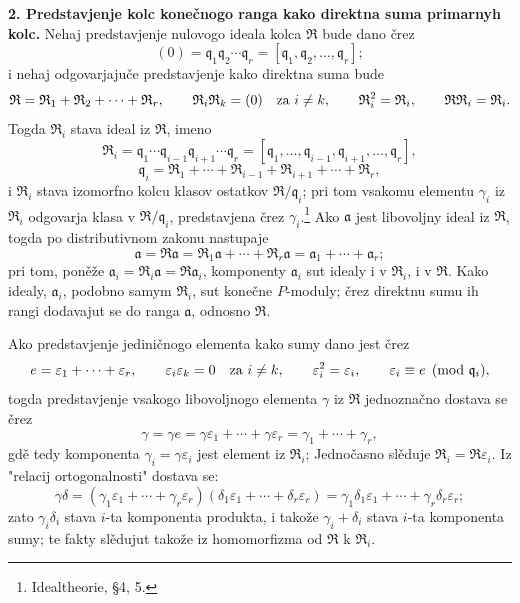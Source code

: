 \documentclass[11pt]{article}
\begin{document}
\setcounter{footnote}{19}

\textbf{2. Predstavjenje kolc konečnogo ranga kako direktna suma primarnyh kolc.} Nehaj predstavjenje nulovogo ideala kolca $\mathfrak R$ bude dano črez
\[
   (0)=\mathfrak q_1\mathfrak q_2\cdots\mathfrak q_r
      =[\mathfrak q_1,\mathfrak q_2,\ldots,\mathfrak q_r];
\]
i nehaj odgovarjajuče predstavjenje kako direktna suma bude
\[
   \mathfrak R=\mathfrak R_1+\mathfrak R_2+\cdots+\mathfrak R_r,
   \qquad
   \mathfrak R_i\mathfrak R_k=(0)\quad\hbox{za } i\ne k,
   \qquad
   \mathfrak R_i^2=\mathfrak R_i,
   \qquad
   \mathfrak R\mathfrak R_i=\mathfrak R_i.
\]
Togda $\mathfrak R_i$ stava ideal iz $\mathfrak R$, imeno
\[
   \mathfrak R_i
   =\mathfrak q_1\cdots\mathfrak q_{i-1}\mathfrak q_{i+1}\cdots\mathfrak q_r
   =[\mathfrak q_1,\ldots,\mathfrak q_{i-1},\mathfrak q_{i+1},\ldots,\mathfrak q_r],
\]
\[
   \mathfrak q_i=\mathfrak R_1+\cdots+\mathfrak R_{i-1}+\mathfrak R_{i+1}+\cdots+\mathfrak R_r,
\]
i $\mathfrak R_i$ stava izomorfno kolcu klasov ostatkov $\mathfrak R/\mathfrak q_i$; pri tom vsakomu elementu $\gamma_i$ iz $\mathfrak R_i$ odgovarja klasa v $\mathfrak R/\mathfrak q_i$, predstavjena črez $\gamma_i$.\footnote{Idealtheorie, \S 4, 5.} Ako $\mathfrak a$ jest libovoljny ideal iz $\mathfrak R$, togda po distributivnom zakonu nastupaje
\[
   \mathfrak a=\mathfrak R\mathfrak a
   =\mathfrak R_1\mathfrak a+\cdots+\mathfrak R_r\mathfrak a
   =\mathfrak a_1+\cdots+\mathfrak a_r;
\]
pri tom, poněže $\mathfrak a_i=\mathfrak R_i\mathfrak a=\mathfrak R\mathfrak a_i$, komponenty $\mathfrak a_i$ sut idealy i v $\mathfrak R_i$, i v $\mathfrak R$. Kako idealy, $\mathfrak a_i$, podobno samym $\mathfrak R_i$, sut konečne $P$-moduly; črez direktnu sumu ih rangi dodavajut se do ranga $\mathfrak a$, odnosno $\mathfrak R$.

Ako predstavjenje jediničnogo elementa kako sumy dano jest črez
\[
   e=\varepsilon_1+\cdots+\varepsilon_r,
   \qquad
   \varepsilon_i\varepsilon_k=0\quad\hbox{za } i\ne k,
   \qquad
   \varepsilon_i^2=\varepsilon_i,
   \qquad
   \varepsilon_i\equiv e\pmod{\mathfrak q_i},
\]
togda predstavjenje vsakogo libovoljnogo elementa $\gamma$ iz $\mathfrak R$ jednoznačno dostava se črez
\[
   \gamma=\gamma e=\gamma\varepsilon_1+\cdots+\gamma\varepsilon_r
      =\gamma_1+\cdots+\gamma_r,
\]
gdě tedy komponenta $\gamma_i=\gamma\varepsilon_i$ jest element iz $\mathfrak R_i$; Jednočasno slěduje $\mathfrak R_i=\mathfrak R\varepsilon_i$. Iz "relacij ortogonalnosti" dostava se:
\[
   \gamma\delta=(\gamma_1\varepsilon_1+\cdots+\gamma_r\varepsilon_r)
      (\delta_1\varepsilon_1+\cdots+\delta_r\varepsilon_r)
   =\gamma_1\delta_1\varepsilon_1+\cdots+\gamma_r\delta_r\varepsilon_r;
\]
zato $\gamma_i\delta_i$ stava $i$-ta komponenta produkta, i takože $\gamma_i+\delta_i$ stava $i$-ta komponenta sumy; te fakty slědujut takože iz homomorfizma od $\mathfrak R$ k $\mathfrak R_i$.
\end{document}

